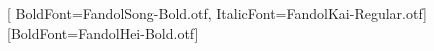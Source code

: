 \usepackage{xeCJK}
[
  BoldFont=FandolSong-Bold.otf,
  ItalicFont=FandolKai-Regular.otf]
[BoldFont=FandolHei-Bold.otf]

